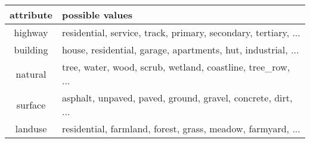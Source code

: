 \documentclass[border={15pt 1pt 5pt 1pt}, varwidth=38em]{standalone}
\begin{document}
\newcommand{\rpm}{\sbox0{$1$}\sbox2{$\scriptstyle\pm$}
  \raise\dimexpr(\ht0-\ht2)/2\relax\box2 }

\begin{table}[]
\centering
\begin{tabular}{c|l}
attribute & possible values \\ \hline
highway & residential, service, track, primary, secondary, tertiary, ... \\ \hline
building & house, residential, garage, apartments, hut, industrial, ... \\ \hline
natural & tree, water, wood, scrub, wetland, coastline, tree\_row, ... \\ \hline
surface & asphalt, unpaved, paved, ground, gravel, concrete, dirt, ... \\ \hline
landuse & residential, farmland, forest, grass, meadow, farmyard, ... \\
\end{tabular}
\end{table}
\end{document}
